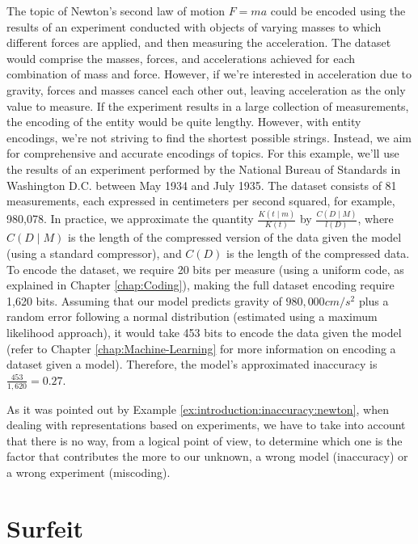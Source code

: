 \begin{example}
\label{ex:introduction:inaccuracy:newton}
The topic of Newton's second law of motion $F = m a$ could be encoded using the results of an experiment conducted with objects of varying masses to which different forces are applied, and then measuring the acceleration. The dataset would comprise the masses, forces, and accelerations achieved for each combination of mass and force. However, if we're interested in acceleration due to gravity, forces and masses cancel each other out, leaving acceleration as the only value to measure. If the experiment results in a large collection of measurements, the encoding of the entity would be quite lengthy. However, with entity encodings, we're not striving to find the shortest possible strings. Instead, we aim for comprehensive and accurate encodings of topics. For this example, we'll use the results of an experiment performed by the National Bureau of Standards in Washington D.C. between May 1934 and July 1935. The dataset consists of 81 measurements, each expressed in centimeters per second squared, for example, 980,078. In practice, we approximate the quantity $\frac{ K(t \mid m) } {K(t)}$ by $\frac{ C(D \mid M) } {l(D)}$, where $C(D \mid M)$ is the length of the compressed version of the data given the model (using a standard compressor), and $C(D)$ is the length of the compressed data. To encode the dataset, we require 20 bits per measure (using a uniform code, as explained in Chapter \ref{chap:Coding}), making the full dataset encoding require 1,620 bits. Assuming that our model predicts gravity of $980,000 cm/s^2$ plus a random error following a normal distribution (estimated using a maximum likelihood approach), it would take 453 bits to encode the data given the model (refer to Chapter \ref{chap:Machine-Learning} for more information on encoding a dataset given a model). Therefore, the model's approximated inaccuracy is $\frac{453}{1,620} = 0.27$.
\end{example}

As it was pointed out by Example \ref{ex:introduction:inaccuracy:newton}, when dealing with representations based on experiments, we have to take into account that there is no way, from a logical point of view, to determine which one is the factor that contributes the more to our unknown, a wrong model (inaccuracy) or a wrong experiment (miscoding).

%
%

\section{Surfeit}
\label{sec:ch1_surfeit}


